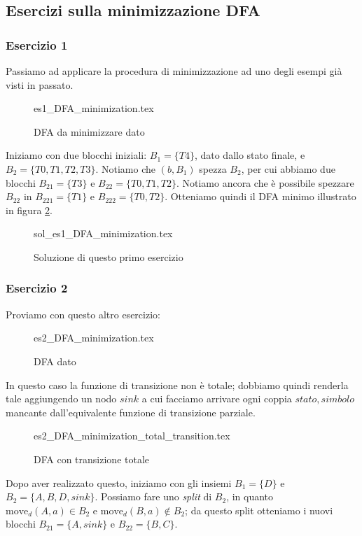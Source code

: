 \documentclass[class=book, crop=false, oneside, 12pt]{standalone}
\begin{document}
\subsection{Esercizi sulla minimizzazione DFA}
\subsubsection{Esercizio 1}
Passiamo ad applicare la procedura di minimizzazione ad uno degli esempi già visti in passato.

\begin{figure}[H]
	\centering
    {es1_DFA_minimization.tex}
	\caption{DFA da minimizzare dato}
	\label{mindfa-es-1}
\end{figure}

Iniziamo con due blocchi iniziali: \(B_{1}=\{T4\}\), dato dallo stato finale, e \(B_{2}=\{T0,T1,T2,T3\}\). Notiamo che \((b,B_{1})\) spezza \(B_{2}\), per cui abbiamo due blocchi \(B_{21}=\{T3\}\) e \(B_{22}=\{T0,T1,T2\}\). Notiamo ancora che è possibile spezzare \(B_{22}\) in \(B_{221}=\{T1\}\) e \(B_{222}=\{T0,T2\}\). Otteniamo quindi il DFA minimo illustrato in figura \ref{mindfa-es1-sol}. 

\begin{figure}[H]
	\centering
    {sol_es1_DFA_minimization.tex}
	\caption{Soluzione di questo primo esercizio}
  \label{mindfa-es1-sol}
\end{figure}

\subsubsection{Esercizio 2}
\label{subsec:dfa-minimization}
Proviamo con questo altro esercizio:
\begin{figure}[H]
	\centering
    {es2_DFA_minimization.tex}
	\caption{DFA dato}
  \label{mindfa-es-2}
\end{figure}
In questo caso la funzione di transizione non è totale; dobbiamo quindi renderla tale aggiungendo un nodo \(sink\) a cui facciamo arrivare ogni coppia \(stato, simbolo\) mancante dall'equivalente funzione di transizione parziale.
\begin{figure}[H]
	\centering
    {es2_DFA_minimization_total_transition.tex}
	\caption{DFA con transizione totale}
  \label{minndfa-es-2-tot}
\end{figure}
Dopo aver realizzato questo, iniziamo con gli insiemi \(B_{1}=\{D\}\) e \(B_{2}=\{A,B,D,sink\}\). Possiamo fare uno \emph{split} di \(B_{2}\), in quanto \(\textrm{move}_{d}(A,a) \in B_{2} \) e \(\textrm{move}_{d}(B,a) \notin B_{2} \); da questo split otteniamo i nuovi blocchi \(B_{21}=\{A,sink\}\) e \(B_{22}=\{B,C\}\).
\end{document}
